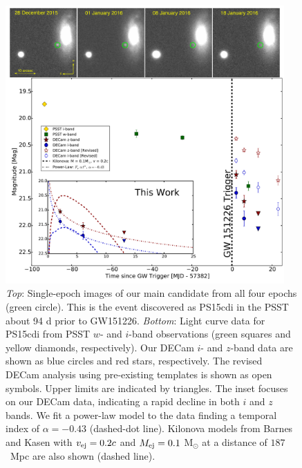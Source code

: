 \begin{figure}[t!]
\centering
\includegraphics[width=0.95\textwidth]{./figs/chapter4/fig2.pdf}
\caption{{\it Top}: Single-epoch images of our main candidate
from all four epochs (green circle). This is the event discovered as PS15cdi in
the PSST about 94 d prior to GW151226. {\it Bottom}: Light
curve data for PS15cdi from PSST $w$- and $i$-band
observations (green squares and yellow diamonds, respectively).
Our DECam $i$- and $z$-band data are shown as
blue circles and red stars, respectively. The revised DECam analysis 
using pre-existing templates is shown as open symbols. Upper
limits are indicated by triangles. The inset focuses on our
DECam data, indicating a rapid decline in both $i$ and $z$
bands.  We fit a power-law model to the data finding a temporal index of 
$\alpha = -0.43$ (dashed-dot line). Kilonova models from Barnes and 
Kasen \citeyearpar{barnes13} with $v_{\rm ej}=0.2c$ and $M_{\rm ej}=0.1$ M$_\odot$ 
at a distance of $187$~Mpc are also shown (dashed line).}
\label{fig:PS15cdi}
\end{figure}

